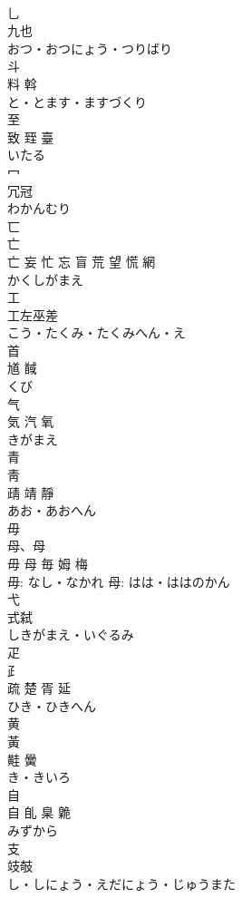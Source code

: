\documentclass[8pt]{extreport}
\begin{document}
\begin{CJK}{UTF8}{min}
\\	乚 
\\	九也	
\\	おつ・おつにょう・つりばり	
\\	斗	
\\	料 斡	
\\	と・とます・ますづくり	
\\	至	
\\	致 臸 臺	
\\	いたる	
\\	冖	
\\	冗冠	
\\	わかんむり	
\\	匸	
\\	亡 
\\	亡 妄 忙 忘 盲 荒 望 慌 網	
\\	かくしがまえ	
\\	工	
\\	工左巫差	
\\	こう・たくみ・たくみへん・え	
\\	首	
\\	馗 馘	
\\	くび	
\\	气	
\\	気 汽 氧	
\\	きがまえ	
\\	青	
\\	靑 
\\	靕 靖 靜	
\\	あお・あおへん	
\\	毋	
\\	母、⺟ 
\\	毋 母 毎 姆 梅	
\\	毋: なし・なかれ 母: はは・ははのかん	
\\	弋	
\\	式弑	
\\	しきがまえ・いぐるみ	
\\	疋	
\\	⺪ 
\\	疏 楚 胥 延	
\\	ひき・ひきへん	
\\	黄	
\\	黃 
\\	黊 黌	
\\	き・きいろ	
\\	自	
\\	自 臫 臬 臲	
\\	みずから	
\\	支	
\\	攱攲	
\\	し・しにょう・えだにょう・じゅうまた	

\end{CJK}
\end{document}
